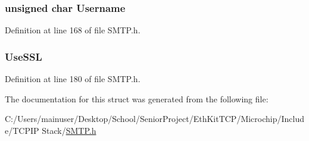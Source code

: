 \subsubsection[{Username}]{\setlength{\rightskip}{0pt plus 5cm}unsigned char Username}\label{struct_s_m_t_p___p_o_i_n_t_e_r_s_a7892428b189b5a1d1a9fc8a3d8a30529}


Definition at line 168 of file S\+M\+T\+P.\+h.

\hypertarget{struct_s_m_t_p___p_o_i_n_t_e_r_s_a239c22601f71586629cc99d074f1f060}{}
\subsubsection[{Use\+S\+S\+L}]{ Use\+S\+S\+L}\label{struct_s_m_t_p___p_o_i_n_t_e_r_s_a239c22601f71586629cc99d074f1f060}


Definition at line 180 of file S\+M\+T\+P.\+h.



The documentation for this struct was generated from the following file\+:\begin{DoxyCompactItemize}
\item 
C\+:/\+Users/mainuser/\+Desktop/\+School/\+Senior\+Project/\+Eth\+Kit\+T\+C\+P/\+Microchip/\+Include/\+T\+C\+P\+I\+P Stack/\hyperlink{_s_m_t_p_8h}{S\+M\+T\+P.\+h}\end{DoxyCompactItemize}
